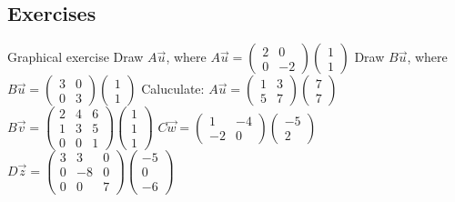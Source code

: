 \documentclass[a4paper]{report}
\begin{document}
\subsection{Exercises}

\begin{Exercise}[label=linalg:mat:8,title=A general matrix for scaling,difficulty=1]
\Question Graphical exercise 
\subQuestion Draw $A\vec{u}$, where $A\vec{u}=\begin{pmatrix}2&0\\0&-2\end{pmatrix}\begin{pmatrix}1\\1\end{pmatrix}$
\subQuestion Draw $B\vec{u}$, where $B\vec{u}=\begin{pmatrix}3&0\\0&3\end{pmatrix}\begin{pmatrix}1\\1\end{pmatrix}$
\Question Caluculate:
\subQuestion $A\vec{u}=\begin{pmatrix}1&3\\5&7\end{pmatrix}\begin{pmatrix}7\\7\end{pmatrix}$
\subQuestion $B\vec{v}=\begin{pmatrix}2&4&6\\1&3&5\\0&0&1\end{pmatrix}\begin{pmatrix}1\\1\\1\end{pmatrix}$
\subQuestion $C\vec{w}=\begin{pmatrix}1&-4\\-2&0\end{pmatrix}\begin{pmatrix}-5\\2\end{pmatrix}$
\subQuestion $D\vec{z}=\begin{pmatrix}3&3&0\\0&-8&0\\0&0&7\end{pmatrix}\begin{pmatrix}-5\\0\\-6\end{pmatrix}$
\end{Exercise}
\end{document}
